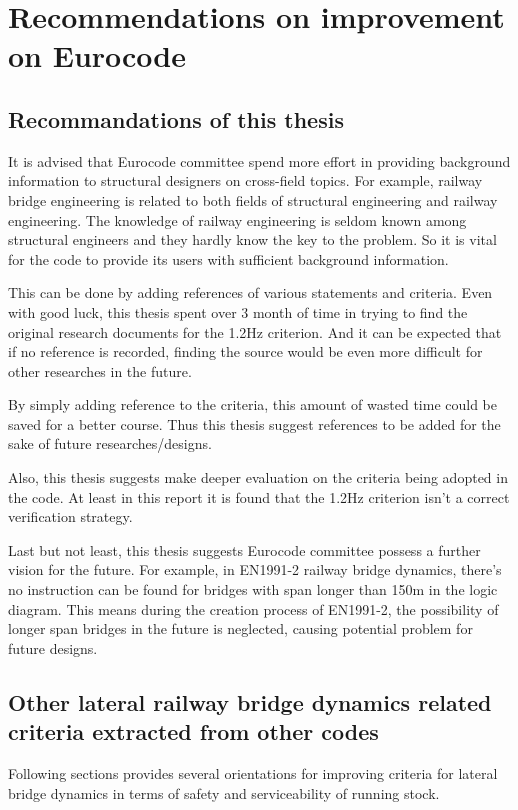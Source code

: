 
\chapter{Recommendations on improvement on Eurocode}


\section{Recommandations of this thesis}

It is advised that Eurocode committee spend more effort in providing background information to structural designers on cross-field topics. For example, railway bridge engineering is related to both fields of structural engineering and railway engineering. The knowledge of railway engineering is seldom known among structural engineers and they hardly know the key to the problem. So it is vital for the code to provide its users with sufficient background information.

This can be done by adding references of various statements and criteria. Even with good luck, this thesis spent over 3 month of time in trying to find the original research documents for the 1.2Hz criterion. And it can be expected that if no reference is recorded, finding the source would be even more difficult for other researches in the future.

By simply adding reference to the criteria, this amount of wasted time could be saved for a better course. Thus this thesis suggest references to be added for the sake of future researches/designs.

Also, this thesis suggests make deeper evaluation on the criteria being adopted in the code. At least in this report it is found that the 1.2Hz criterion isn't a correct verification strategy. 

Last but not least, this thesis suggests Eurocode committee possess a further vision for the future. For example, in EN1991-2 railway bridge dynamics, there's no instruction can be found for bridges with span longer than 150m in the logic diagram. This means during the creation process of EN1991-2, the possibility of longer span bridges in the future is neglected, causing potential problem for future designs. 

\section{Other lateral railway bridge dynamics related criteria extracted from other codes}
Following sections provides several orientations for improving criteria for lateral bridge dynamics in terms of safety and serviceability of running stock.


